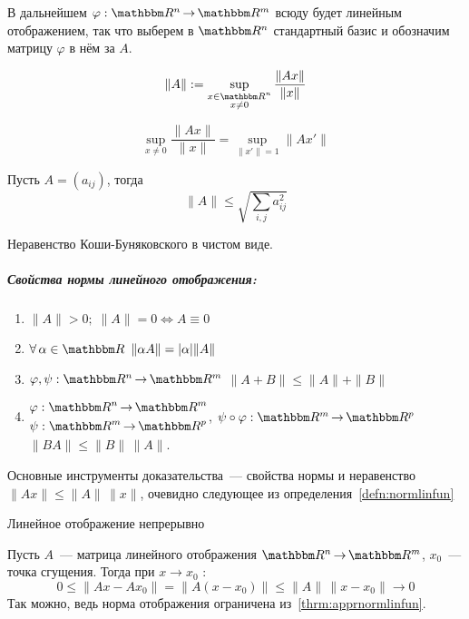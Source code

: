\documentclass[12pt]{../../notes}
\begin{document}
\begin{rem}
  В дальнейшем $\varphi : \R^n \to \R^m$ всюду будет линейным отображением,
  так что выберем в $\R^n$ стандартный базис и обозначим матрицу $\varphi$ в нём за $A$.
\end{rem}

\begin{defn}\label{defn:normlinfun}
  \[
    \| A \| := \sup_{\substack{x \in \R^n \\ x\neq 0}} \frac{\|Ax\|}{\|x\|}
  \]
\end{defn}
\begin{lem}\label{lem:normnormlinfun}
  \[
    \sup_{x \neq 0}  \frac{\|Ax\|}{\|x\|}  = \sup_{\|x'\|=1} \|Ax'\|
  \]
\end{lem}

\begin{thrm}\label{thrm:apprnormlinfun}
  Пусть $A = (a_{ij})$, тогда
  \[
    \| A \| \leqslant \sqrt{\sum_{i,j}a_{ij}^2}
  \]
\end{thrm}
\begin{ittproof}
  Неравенство Коши-Буняковского в чистом виде.
\end{ittproof}

\subparagraph{ Свойства нормы линейного отображения:}
\begin{enumerate}
  \item $\|A\| > 0; \; \|A\|=0 \Leftrightarrow A\equiv 0$
  \item $\forall\,\alpha \in \R\;\: \|\alpha A\| = |\alpha| \|A\|$
  \item $\varphi,\psi:\R^n \to \R^m$ $\|A+B\| \leqslant \|A\| + \|B\|$
  \item $\displaystyle
    \begin{aligned}
      &\varphi : \R^n \to \R^m \\
      &\psi: \R^m \to \R^p
    \end{aligned}$, $\psi \circ \varphi : \R^m \to \R^p$ $\|BA\| \leqslant \|B\|\,\|A\|$.
\end{enumerate}
\begin{itlproof}
  Основные инструменты доказательства~--- свойства нормы и неравенство $\| Ax \| \leqslant \|A\|\,\|x\|$, очевидно следующее
  из определения~\ref{defn:normlinfun}
\end{itlproof}

\begin{stat}\label{stat:lincont}
  Линейное отображение непрерывно
\end{stat}
\begin{itlproof}
  Пусть $A$~--- матрица линейного отображения $\R^n \to \R^m$, $x_0$~--- точка сгущения.
  Тогда при $x \to x_0$ :
  \[
    0 \leqslant \| Ax - Ax_0 \| = \| A(x-x_0) \| \leqslant \|A\| \, \|x - x_0\| \to 0
  \]
  Так можно, ведь норма отображения ограничена из~\ref{thrm:apprnormlinfun}.
\end{itlproof}
\end{document}
